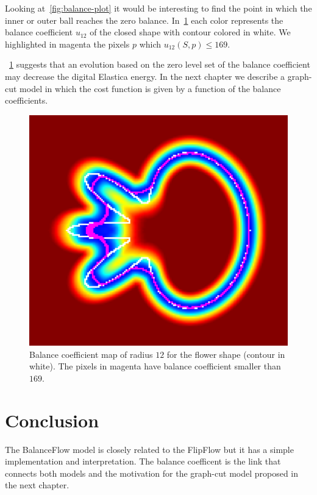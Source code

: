 Looking at~\cref{fig:balance-plot} it would be interesting to find the point in which the inner or outer ball reaches the zero balance. In~\cref{fig:flower-balance-coefficient-zero-set} each color represents the balance coefficient $u_{12}$ of the closed shape with contour colored in white. We highlighted in magenta the pixels $p$ which $u_{12}(S,p) \leq 169$.

~\cref{fig:flower-balance-coefficient-zero-set} suggests that an evolution based on the zero level set of the balance coefficient may decrease the digital Elastica energy. In the next chapter we describe a graph-cut model in which the cost function is given by a function of the balance coefficients.

\begin{figure}
\center
\includegraphics[scale=0.05]{figures/chapter7/level-set/flower.pdf}
\caption{Balance coefficient map of radius $12$ for the flower shape (contour in white). The pixels in magenta have balance coefficient smaller than $169$. }
\label{fig:flower-balance-coefficient-zero-set}
\end{figure}


\section{Conclusion}
The BalanceFlow model is closely related to the FlipFlow but it has a simple implementation and interpretation. The balance coefficent is the link that connects both models and the motivation for the graph-cut model proposed in the next chapter.




